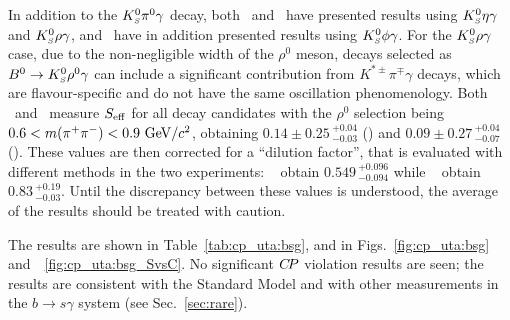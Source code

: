 In addition to the $K^0_{\scriptscriptstyle S}\pi^0\gamma$ decay, both \babar\ and \belle\ have presented results using $K^0_{\scriptscriptstyle S}\eta\gamma$ and $K^0_{\scriptscriptstyle S}\rho\gamma$, and \belle\ have in addition presented results using $K^0_{\scriptscriptstyle S}\phi\gamma$.
For the $K^0_{\scriptscriptstyle S}\rho\gamma$ case, due to the non-negligible width of the $\rho^0$ meson, decays selected as $B^0 \to K^0_{\scriptscriptstyle S}\rho^0\gamma$ can include a significant contribution from $K^{*\pm}\pi^\mp\gamma$ decays, which are flavour-specific and do not have the same oscillation phenomenology. 
Both \babar\ and \belle\ measure $S_{\rm eff}$ for all \B decay candidates with the $\rho^0$ selection being $0.6 < m(\pi^+\pi^-) < 0.9 \ {\rm GeV}/c^2$, obtaining $0.14 \pm 0.25 \,^{+0.04}_{-0.03}$ (\babar) and $0.09 \pm 0.27 \,^{+0.04}_{-0.07}$ (\belle). These values are then corrected for a ``dilution factor'', that is evaluated with different methods in the two experiments: \babar~\cite{Akar:2013ima} obtain $0.549 \,^{+0.096}_{-0.094}$ while \belle~\cite{Li:2008qma} obtain $0.83 \,^{+0.19}_{-0.03}$. Until the discrepancy between these values is understood, the average of the results should be treated with caution.




The results are shown in Table~\ref{tab:cp_uta:bsg},
and in Figs.~\ref{fig:cp_uta:bsg} and~~\ref{fig:cp_uta:bsg_SvsC}.
No significant $C\!P$ violation results are seen;
the results are consistent with the Standard Model
and with other measurements in the $b \to s\gamma$ system (see Sec.~\ref{sec:rare}).

